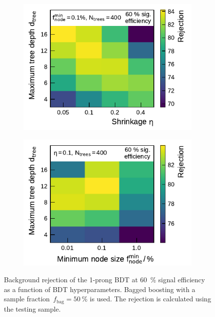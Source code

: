 \begin{figure}[htb]
\begin{subfigure}[t]{0.48\textwidth}
    \includegraphics{./figures/bdt_perf/gridsearch_1p/scan_Shrinkage_MaxDepth.pdf}
    \vspace*{-1.6em}
    \subcaption{}
    \label{fig:gridscan_shrinkage_maxdepth}
  \end{subfigure}\hfill
  \begin{subfigure}[t]{0.48\textwidth}
    \centering
    \includegraphics{./figures/bdt_perf/gridsearch_1p/scan_MinNodeSize_MaxDepth.pdf}
    \vspace*{-1.6em}
    \subcaption{}
    \label{fig:gridscan_minnodesize_maxdepth}
  \end{subfigure}
  \vspace*{-0.3em}
  \caption{Background rejection of the 1-prong BDT at \SI{60}{\percent} signal
    efficiency as a function of BDT hyperparameters. Bagged boosting with a
    sample fraction~$f_\text{bag} = \SI{50}{\percent}$ is used. The rejection is
    calculated using the testing sample.}
  \label{fig:hyperparameter_scan_1p}
\end{figure}


